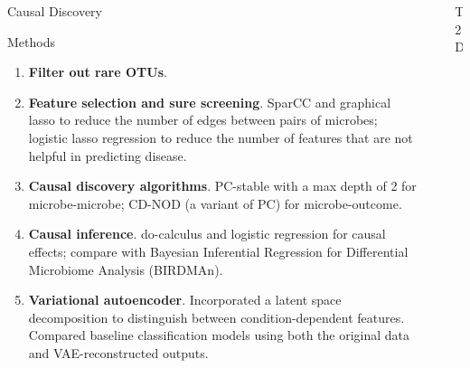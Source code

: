 \documentclass[final]{beamer}
\newlength{\sepwidth}
\newlength{\colwidth}
\newcommand{\separatorcolumn}{\begin{column}{\sepwidth}\end{column}}
\begin{document}
\begin{frame}[t]
\begin{columns}[t]
\begin{column}{\colwidth}
\begin{alertblock}{Causal Discovery}
	  \end{alertblock}
	  
	  \vspace{0.5cm}
	  
\begin{block}{Methods}


    \begin{enumerate}
      \item \textbf{Filter out rare OTUs}. 
      \item \textbf{Feature selection and sure screening}. SparCC and graphical lasso to reduce the number of edges between pairs of microbes; logistic lasso regression to reduce the number of features that are not helpful in predicting disease. 
      \item \textbf{Causal discovery algorithms}. PC-stable with a max depth of 2 for microbe-microbe; CD-NOD (a variant of PC) for microbe-outcome.
      \item \textbf{Causal inference}. do-calculus and logistic regression for causal effects; compare with Bayesian Inferential Regression for Differential Microbiome Analysis (BIRDMAn).
      \item \textbf{Variational autoencoder}. Incorporated a latent space decomposition to distinguish between condition-dependent features. Compared baseline classification models using both the original data and VAE-reconstructed outputs.
    \end{enumerate}


  \end{block}


\end{column}

\separatorcolumn

\begin{column}{\colwidth}

  
  \begin{block}{T2D}



\end{block}
\end{column}
\end{columns}
\end{frame}
\end{document}
